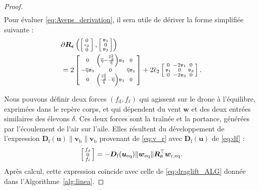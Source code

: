 \begin{proof}
\begin{align}
\end{align}
Pour évaluer \eqref{eq:Aveps_derivation}, il sera utile de dériver la forme simplifiée suivante : 
\begin{align}
\label{eq:diffRsparse}
    &\partial \boldsymbol{R}_{\boldsymbol{ \epsilon}} \left(
    \left[ \begin{smallmatrix}0 \\ \epsilon_2 \\ 0 \end{smallmatrix} \right]
    ,\left[ \begin{smallmatrix}\mathfrak{v}_1 \\ 0 \\ \mathfrak{v}_3 \end{smallmatrix} \right]\right) \nonumber \\ 
    & = 2  \left[ \begin{smallmatrix}0 & \left( \overline{\eta} - \frac{\overline \epsilon_{2}^{2}}{\overline{\eta}} \right) \mathfrak{v}_3 & 0\\
    -\overline{\eta} \mathfrak{v}_3 & 0 & \overline{\eta} \mathfrak{v}_1 \\
    0 & \left( \frac{\overline \epsilon_{2}^{2}}{\overline{\eta}} - \overline{\eta} \right) \mathfrak{v}_1 & 0 \end{smallmatrix} \right] + 2\overline \epsilon_{2}\left[ \begin{smallmatrix} 0 & -2\mathfrak{v}_1 & 0\\
    \mathfrak{v}_1 & 0 & \mathfrak{v}_3 \\
    0 & -2\mathfrak{v}_3 & 0 \end{smallmatrix} \right].
\end{align}

Nous pouvons définir deux forces $(f_{\text{d}} , f_{\ell})$ qui agissent sur le drone à l'équilibre, exprimées dans le repère corps, et qui dépendent du vent $\boldsymbol{w}$ et des deux entrées similaires des élevons $\delta$. Ces deux forces sont la traînée et la portance, générées par l'écoulement de l'air sur l'aile. Elles résultent du développement de l'expression $ \boldsymbol{D}_{\text{f}}(\boldsymbol{u}) \lVert \boldsymbol{v}_{\text{b}} \rVert \boldsymbol{v}_{\text{b}}$ provenant de \eqref{eq:v_r} avec $\boldsymbol{D}_{\text{f}}(\boldsymbol{u})$ de \eqref{eq:df} :
\begin{align}
\label{eq:draglift}
    \left[ \begin{smallmatrix}f_{\text{d}} \\ 0 \\ f_{\ell} \end{smallmatrix} \right] = - \boldsymbol{D}_{\text{f}}(\boldsymbol{u_{\text{eq}}}) \lVert \boldsymbol{w}_{\mathrm{eq}} \rVert  \boldsymbol{R}_\theta^\top \boldsymbol{w}_{\mathrm{r,eq}}.
\end{align}
Après calcul, cette expression coïncide avec celle de \eqref{eq:draglift_ALG} donnée dans l'Algorithme~\ref{alg:linea}. 


\end{proof}
